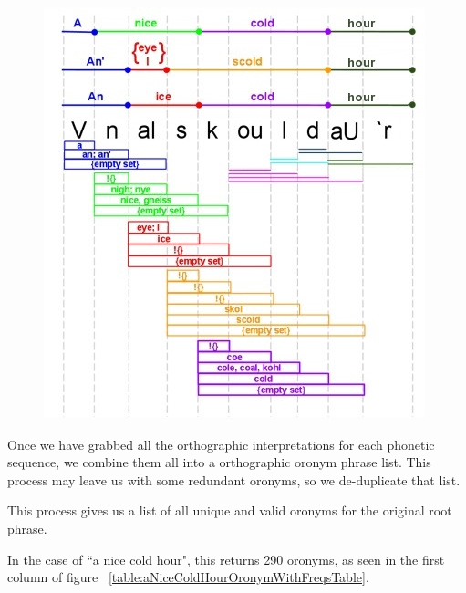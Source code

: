 \begin{figure}[h]
\includegraphics{aNiceColdHourPhoneToOrthoBreakdown.jpg}
\captionfonts
\caption{}
\label{fig:aNiceColdHourPhoneToOrthoGraph}
\end{figure}

Once we have grabbed all the orthographic interpretations for each phonetic sequence, we combine them all into a orthographic oronym phrase list. This process may leave us with some redundant oronyms, so we de-duplicate that list.

This process gives us a list of all unique and valid oronyms for the original root phrase.

In the case of ``a nice cold hour", this returns 290 oronyms, as seen in the first column of figure ~\ref{table:aNiceColdHourOronymWithFreqsTable}.



